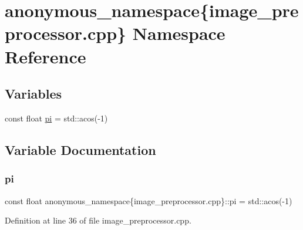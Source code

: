 \hypertarget{namespaceanonymous__namespace_02image__preprocessor_8cpp_03}{}\section{anonymous\+\_\+namespace\{image\+\_\+preprocessor.\+cpp\} Namespace Reference}
\label{namespaceanonymous__namespace_02image__preprocessor_8cpp_03}
\subsection*{Variables}
\begin{DoxyCompactItemize}
\item 
const float \hyperlink{namespaceanonymous__namespace_02image__preprocessor_8cpp_03_a9624405339d16214b745f28f39979c6d}{pi} = std\+::acos(-\/1)
\end{DoxyCompactItemize}


\subsection{Variable Documentation}
\mbox{\label{namespaceanonymous__namespace_02image__preprocessor_8cpp_03_a9624405339d16214b745f28f39979c6d}} 
\subsubsection{\texorpdfstring{pi}{pi}}
{\footnotesize\ttfamily const float anonymous\+\_\+namespace\{image\+\_\+preprocessor.\+cpp\}\+::pi = std\+::acos(-\/1)}



Definition at line 36 of file image\+\_\+preprocessor.\+cpp.

